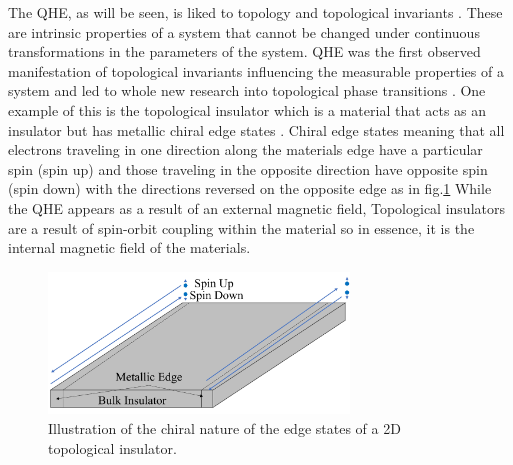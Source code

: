 The QHE, as will be seen, is liked to topology and topological invariants \cite{tong_notes}. These are intrinsic properties of a system that cannot be changed under continuous transformations in the parameters of the system. QHE was the first observed manifestation of topological invariants influencing the measurable properties of a system and led to whole new research into topological phase transitions \cite{RevModPhys.82.3045}. One example of this is the topological insulator which is a material that acts as an insulator but has metallic chiral edge states \cite{Moore2010}. Chiral edge states meaning that all electrons traveling in one direction along the materials edge have a particular spin (spin up) and those traveling in the opposite direction have opposite spin (spin down) with the directions reversed on the opposite edge as in fig.\ref{top_insulator} While the QHE appears as a result of an external magnetic field, Topological insulators are a result of spin-orbit coupling within the material so in essence, it is the internal magnetic field of the materials. 

\begin{figure}[h!]
    \centering
    \includegraphics[width=8cm]{figures/top_insulator.pdf}
    \caption{Illustration of the chiral nature of the edge states of a 2D topological insulator. }
    \label{top_insulator}
\end{figure}
